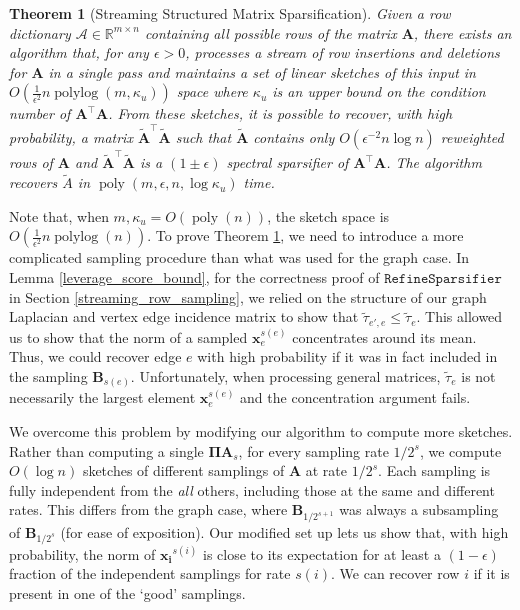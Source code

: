 \documentclass[11pt]{article}
\newcommand{\bs}[1]{\boldsymbol{#1}}
\newcommand{\bv}[1]{\mathbf{#1}}
\newcommand{\refine}{\texttt{RefineSparsifier}}
\newcommand{\plog}{\mathop\mathrm{polylog}}
\newcommand{\poly}{\mathop\mathrm{poly}}
\newcommand{\R}{\mathbb{R}}
\newcommand{\mvar}[1]{\bv{#1}}
\newcommand{\ma}{\mvar{A}}
\newcommand{\mpi}{\mvar{\Pi}}
\newtheorem{theorem}{Theorem}
\begin{document}
\begin{theorem}[Streaming Structured Matrix Sparsification] \label{main_structured_theorem}
Given a row dictionary $\bs{\mathcal{A}}\in\R^{m\times n}$ containing all possible rows of the matrix $\bv{A}$, there
exists an algorithm that, for any $\epsilon>0$, processes a stream
of row insertions and deletions for $\ma$ in a single
pass and maintains a set of linear sketches of this input in $O\left(\frac{1}{\epsilon^{2}}n\plog(m,\kappa_u)\right)$
space where $\kappa_u$ is an upper bound on the condition number of $\ma^\top\ma$. From these
sketches, it is possible to recover, with high probability, a matrix
$\bv{\tilde{A}}^{\top}\bv{\tilde{A}}$ such that $\bv{\tilde{A}}$
contains only $O(\epsilon^{-2}n\log n)$ reweighted rows of $\ma$
and $\bv{\tilde{A}}^{\top}\bv{\tilde{A}}$ is a $(1\pm\epsilon)$ spectral
sparsifier of $\ma^{\top}\ma$. The algorithm recovers $\tilde A$ in $\poly(m,\epsilon, n, \log \kappa_u)$ time.
\end{theorem}
Note that, when $m,\kappa_u = O(\poly(n))$, the sketch space is $O\left(\frac{1}{\epsilon^{2}}n\plog(n)\right)$.
To prove Theorem \ref{main_structured_theorem}, we need to introduce a more complicated sampling procedure than what was used for the graph case. In Lemma \ref{leverage_score_bound}, for the correctness proof of $\refine$ in Section \ref{streaming_row_sampling}, we relied on the structure of our graph Laplacian and vertex edge incidence matrix to show that $\tilde \tau_{e',e} \le \tilde \tau_e$. This allowed us to show that the norm of a sampled $\bv{x}_e^{s(e)}$ concentrates around its mean. Thus, we could recover edge $e$ with high probability if it was in fact included in the sampling $\bv{B}_{s(e)}$. Unfortunately, when processing general matrices, $\tilde \tau_e$ is not necessarily the largest element $\bv{x}_e^{s(e)}$ and the concentration argument fails.

We overcome this problem by modifying our algorithm to compute more sketches. Rather than computing a single $\mpi \bv{A}_s$, for every sampling rate $1/2^s$, we compute $O(\log n)$ sketches of different samplings of $\bv{A}$ at rate $1/2^s$. Each sampling is fully independent from the \emph{all} others, including those at the same and different rates. This differs from the graph case, where $\bv{B}_{1/2^{s+1}}$ was always a subsampling of $\bv{B}_{1/2^{s}}$ (for ease of exposition). Our modified set up lets us show that, with high probability, the norm of $\bv{x_i}^{s(i)}$ is close to its expectation for at least a $(1-\epsilon)$ fraction of the independent samplings for rate $s(i)$. We  can recover row $i$ if it is present in one of the `good' samplings. 
\end{document}

